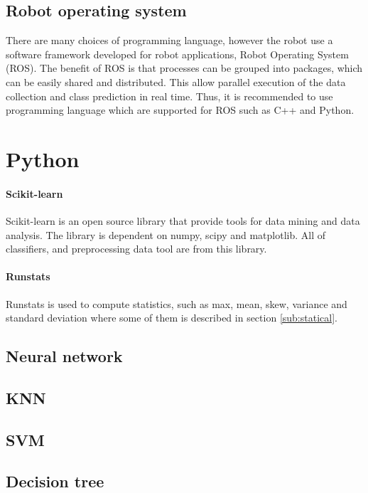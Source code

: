 \documentclass[USenglish]{ifimaster}  %
\begin{document}
\subsection{Robot operating system}
There are many choices of programming language, however the robot use a software framework developed for robot applications, Robot Operating System (ROS). The benefit of ROS is that processes can be grouped into packages, which can be easily shared and distributed. This allow parallel execution of the data collection and class prediction in real time. Thus, it is recommended to use programming language which are supported for ROS such as C++ and Python. 	


\section{Python}

\paragraph{Scikit-learn}
Scikit-learn \cite{scikit-learn} is an open source library that provide tools for data mining and data analysis. The library is dependent on numpy, scipy and matplotlib. All of classifiers, and preprocessing data tool are from this library. 

\paragraph{Runstats}
Runstats \cite{runstats} is used to compute statistics, such as max, mean, skew, variance and standard deviation where some of them is described in section \ref{sub:statical}.

\subsection{Neural network}

\subsection{KNN}

\subsection{SVM}

\subsection{Decision tree}
\end{document}
